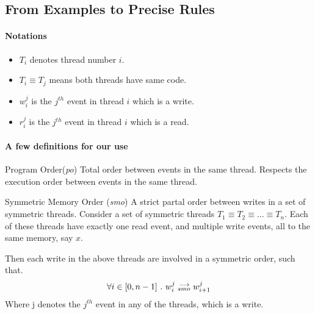 \subsection{From Examples to Precise Rules}

    \paragraph{Notations}
        \begin{itemize}
            \item $T_i$ denotes thread number $i$.
            \item $T_i \equiv T_j$ means both threads have same code.
            \item $w_i^j$ is the $j^{th}$ event in thread $i$ which is a write.
            \item $r_i^j$ is the $j^{th}$ event in thread $i$ which is a read. 
        \end{itemize}

    
    \paragraph{A few definitions for our use}

    \begin{definition}{Program Order(\emph{po})}
        Total order between events in the same thread. Respects the execution order between events in the same thread. 
    \end{definition}

    \begin{definition}{Symmetric Memory Order (\emph{smo})}
        \label{SymMemO}
        A strict partal order between writes in a set of symmetric threads. Consider a set of symmetric threads $T_1 \equiv T_2 \equiv ... \equiv T_n$. Each of these threads have exactly one read event, and multiple write events, all to the same memory, say $x$. 

        Then each write in the above threads are involved in a symmetric order, such that. 
        \begin{align*}
            \forall i \in [0, n-1] \ . \ w_i^j\stackrel{\longrightarrow}{_{smo}}w_{i+1}^j
        \end{align*}
        Where j denotes the $j^{th}$ event in any of the threads, which is a write.
    \end{definition}


